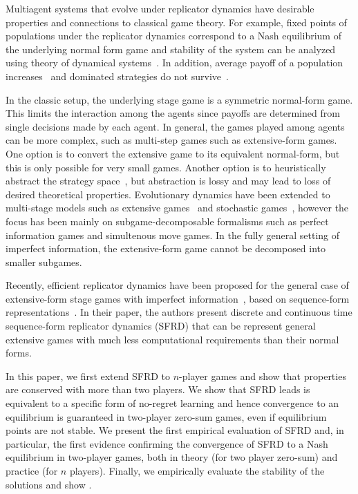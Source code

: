 \documentclass{aamas2014}
\newcommand{\todo}[1]{{\color{red}{\bf #1}}}
\begin{document}
Multiagent systems that evolve under replicator dynamics have desirable properties and connections to classical game theory. 
For example, fixed points of populations under the replicator dynamics correspond to a Nash equilibrium of the underlying normal 
form game and stability of the system can be analyzed using theory of dynamical systems~\cite{FudLev98,Gintis09}. 
In addition, average payoff of a population increases~\cite{HS98} and dominated strategies do not survive~\cite{Gintis09}. 

In the classic setup, the underlying stage game is a symmetric normal-form game. This limits the interaction
among the agents since payoffs are determined from single decisions made by each agent. In general, the games played among agents 
can be more complex, such as multi-step games such as extensive-form games. 
One option is to convert the extensive game to its equivalent normal-form, but this is only possible for very small games. 
Another option is to heuristically abstract the strategy space~\cite{ponsen09b}, but 
abstraction is lossy and may lead to loss of desired theoretical properties.
Evolutionary dynamics have been extended to 
multi-stage models such as extensive games~\cite{Cressman03} and stochastic games~\cite{Flesch13Evolutionary,Hennes09State}, 
however the focus has been mainly on subgame-decomposable formalisms such as perfect information games and
simultenous move games. In the fully general setting of imperfect information, the extensive-form game cannot be 
decomposed into smaller subgames. 

Recently, efficient replicator dynamics have been proposed for the general case of extensive-form stage games with 
imperfect information~\cite{Gatti13Efficient}, based on sequence-form representations~\cite{SequenceFormLPs}. 
In their paper, the authors present discrete and continuous time sequence-form replicator dynamics (SFRD)
that can be represent general extensive games with much less computational requirements than their 
normal forms. 

In this paper, we first extend SFRD to $n$-player games and show that properties are conserved with more than two players. 
We show that SFRD leads is equivalent to a specific form of no-regret learning and hence convergence to an 
equilibrium is guaranteed in two-player zero-sum games, even if equilibrium points are not stable. 
We present the first empirical evaluation of SFRD and, in particular, the first evidence confirming the convergence 
of SFRD to a Nash equilibrium in two-player games, both in theory (for two player zero-sum) and practice (for $n$ players).
Finally, we empirically evaluate the stability of the solutions and show \todo{something}.
\end{document}
